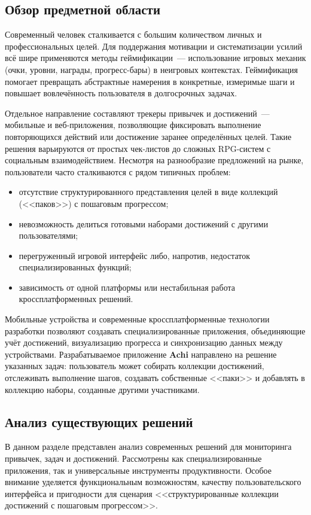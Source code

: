 \documentclass[../main.tex]{subfiles}
\begin{document}
\subsection{Обзор предметной области}

Современный человек сталкивается с большим количеством личных и профессиональных целей. Для поддержания мотивации и систематизации усилий всё шире применяются методы геймификации~--- использование игровых механик (очки, уровни, награды, прогресс-бары) в неигровых контекстах. Геймификация помогает превращать абстрактные намерения в конкретные, измеримые шаги и повышает вовлечённость пользователя в долгосрочных задачах.

Отдельное направление составляют трекеры привычек и достижений~--- мобильные и веб-приложения, позволяющие фиксировать выполнение повторяющихся действий или достижение заранее определённых целей. Такие решения варьируются от простых чек-листов до сложных RPG-систем с социальным взаимодействием. Несмотря на разнообразие предложений на рынке, пользователи часто сталкиваются с рядом типичных проблем:
\begin{itemize}[leftmargin=*]
	\item отсутствие структурированного представления целей в виде коллекций (<<паков>>) с пошаговым прогрессом;
	\item невозможность делиться готовыми наборами достижений с другими пользователями;
	\item перегруженный игровой интерфейс либо, напротив, недостаток специализированных функций;
	\item зависимость от одной платформы или нестабильная работа кроссплатформенных решений.
\end{itemize}

Мобильные устройства и современные кроссплатформенные технологии разработки позволяют создавать специализированные приложения, объединяющие учёт достижений, визуализацию прогресса и синхронизацию данных между устройствами. Разрабатываемое приложение \textbf{Achi} направлено на решение указанных задач: пользователь может собирать коллекции достижений, отслеживать выполнение шагов, создавать собственные <<паки>> и добавлять в коллекцию наборы, созданные другими участниками.

\subsection{Анализ существующих решений}

В данном разделе представлен анализ современных решений для мониторинга привычек, задач и достижений. Рассмотрены как специализированные приложения, так и универсальные инструменты продуктивности. Особое внимание уделяется функциональным возможностям, качеству пользовательского интерфейса и пригодности для сценария <<структурированные коллекции достижений с пошаговым прогрессом>>.
\end{document}
